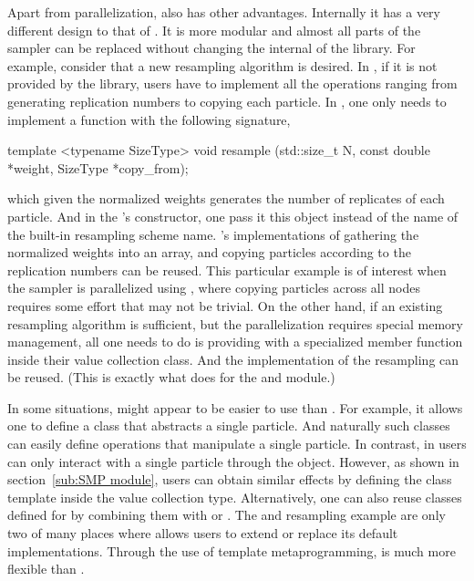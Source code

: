 \documentclass[11pt, fontset=Minion, showoverfull,
bib, mintcode, minted=cache]{marticle}
\begin{document}
Apart from parallelization, \vsmc also has other advantages. Internally it has
a very different design to that of \lsmctc. It is more modular and almost all
parts of the sampler can be replaced without changing the internal of the
library. For example, consider that a new resampling algorithm is desired. In
\lsmctc, if it is not provided by the library, users have to implement all the
operations ranging from generating replication numbers to copying each
particle. In \vsmc, one only needs to implement a function with the following
signature,
\begin{cppcode}
template <typename SizeType>
void resample (std::size_t N, const double *weight, SizeType *copy_from);
\end{cppcode}
which given the normalized weights generates the number of replicates of each
particle. And in the 's constructor, one pass it this
object instead of the name of the built-in resampling scheme name. \vsmc's
implementations of gathering the normalized weights into an array, and copying
particles according to the replication numbers can be reused. This particular
example is of interest when the sampler is parallelized using \lmpi, where
copying particles across all nodes requires some effort that may not be
trivial. On the other hand, if an existing resampling algorithm is sufficient,
but the parallelization requires special memory management, all one needs to
do is providing \vsmc with a specialized  member function
inside their value collection class. And the implementation of the resampling
can be reused. (This is exactly what \vsmc does for the \lopencl and \lmpi
module.)

In some situations, \lsmctc might appear to be easier to use than \vsmc. For
example, it allows one to define a class that abstracts a single particle. And
naturally such classes can easily define operations that manipulate a single
particle. In contrast, in \vsmc users can only interact with a single particle
through the  object. However, as shown in
section~\ref{sub:SMP module}, users can obtain similar effects by defining the
 class template inside the value collection
type. Alternatively, one can also reuse classes defined for \lsmctc by
combining them with  or . The
 and resampling example are only two of many
places where \vsmc allows users to extend or replace its default
implementations. Through the use of template metaprogramming, \vsmc is much
more flexible than \lsmctc.
\end{document}
